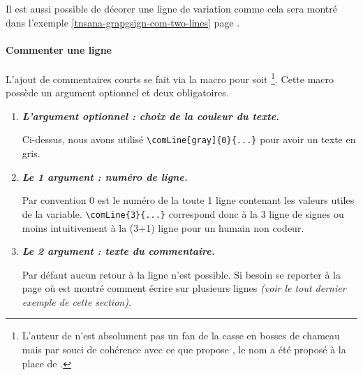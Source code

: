 \documentclass[12pt,a4paper]{article}
\begin{document}
\begin{remark}
	Il est aussi possible de décorer une ligne de variation comme cela sera montré dans l'exemple \ref{tnsana-grapgsign-com-two-lines} page \pageref{tnsana-grapgsign-com-two-lines}. 
\end{remark}




\paragraph{Commenter une ligne}

L'ajout de commentaires courts se fait via la macro  pour  soit 
\footnote{
    L'auteur de  n'est absolument pas un fan de la casse en bosses de chameau mais par souci de cohérence avec ce que propose , le nom  a été proposé à la place de .
}.
Cette macro possède un argument optionnel et deux obligatoires.

\begin{enumerate}
    \item \textbf{\emph{L'argument optionnel : choix de la couleur du texte.}}
          
          \smallskip
          
          Ci-dessus, nous avons utilisé \verb#\comLine[gray]{0}{...}# pour avoir un texte en gris.


    \medskip
    \item \textbf{\emph{Le 1\ier{} argument : numéro de ligne.}}
          
          \smallskip
          
          Par convention $0$ est le numéro de la toute 1\iere{} ligne contenant les valeurs utiles de la variable.
          \verb#\comLine{3}{...}# correspond donc à la 3\ieme{} ligne de signes ou moins intuitivement à la (3+1)\ieme{} ligne pour un humain non codeur.

    \medskip
    \item \textbf{\emph{Le 2\ieme{} argument : texte du commentaire.}}
          
          \smallskip
          
          Par défaut aucun retour à la ligne n'est possible.
          Si besoin se reporter à la  page \pageref{tnsana-grapgsign-com-two-lines} où est montré comment écrire sur plusieurs lignes \emph{(voir le tout dernier exemple de cette section)}.
\end{enumerate}
\end{document}
